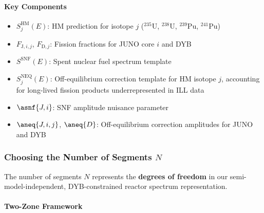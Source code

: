 \paragraph{Key Components}
\begin{itemize}
  \item $S^{\text{HM}}_j(E)$: HM prediction for isotope $j$ (${}^{235}$U, ${}^{238}$U, ${}^{239}$Pu, ${}^{241}$Pu)
  \item $F_{\text{J},i,j}$, $F_{\text{D},j}$: Fission fractions for JUNO core $i$ and DYB
  \item $S^{\text{SNF}}(E)$: Spent nuclear fuel spectrum template
  \item $S_j^{\text{NEQ}}(E)$: Off-equilibrium correction template for HM isotope $j$, accounting for long-lived fission products underrepresented in ILL data
  \item $\asnf{J,i}$: SNF amplitude nuisance parameter
  \item $\aneq{J,i,j}$, $\aneq{D}$: Off-equilibrium correction amplitudes for JUNO and DYB
\end{itemize}



\subsubsection{Choosing the Number of Segments $N$}

The number of segments $N$ represents the \textbf{degrees of freedom} in our semi-model-independent,
DYB-constrained reactor spectrum representation.

\paragraph{Two-Zone Framework}

